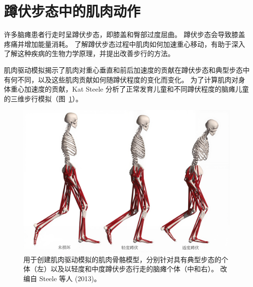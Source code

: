 \section{蹲伏步态中的肌肉动作}

许多脑瘫患者行走时呈蹲伏步态，即膝盖和臀部过度屈曲。
蹲伏步态会导致膝盖疼痛并增加能量消耗。
了解蹲伏步态过程中肌肉如何加速重心移动，有助于深入了解这种疾病的生物力学原理，并提出改善步行的方法。


肌肉驱动模拟揭示了肌肉对重心垂直和前后加速度的贡献在蹲伏步态和典型步态中有何不同，以及这些肌肉贡献如何随蹲伏程度的变化而变化。
为了计算肌肉对身体重心加速度的贡献，Kat Steele 分析了正常发育儿童和不同蹲伏程度的脑瘫儿童的三维步行模拟（图~\ref{fig:11_12}）。


\begin{figure}[!htb]
	\centering
	\includegraphics[width=1.0\linewidth]{chap11/11_12}
	\caption{用于创建肌肉驱动模拟的肌肉骨骼模型，分别针对具有典型步态的个体（左）以及以轻度和中度蹲伏步态行走的脑瘫个体（中和右）。
		改编自 Steele 等人 (2013)。 \label{fig:11_12}}
\end{figure}







